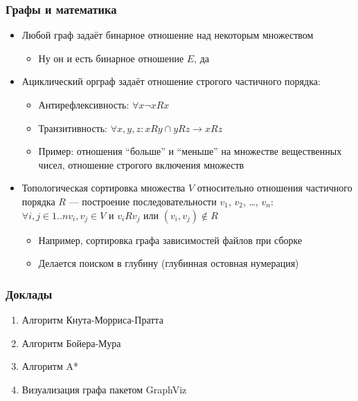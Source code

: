 \documentclass[xetex,mathserif,serif]{beamer}
\begin{document}
    \begin{frame}
        \frametitle{Графы и математика}
        \begin{itemize}
            \item Любой граф задаёт бинарное отношение над некоторым множеством
            \begin{itemize}
                \item Ну он и есть бинарное отношение $E$, да
            \end{itemize}
            \item Ациклический орграф задаёт отношение строгого частичного порядка:
            \begin{itemize}
                \item Антирефлексивность: $\forall x \neg xRx$
                \item Транзитивность: $\forall x,y,z: xRy \cap yRz \rightarrow xRz$
                \item Пример: отношения ``больше'' и ``меньше'' на множестве вещественных чисел, отношение строгого включения множеств
            \end{itemize}
            \item Топологическая сортировка множества $V$ относительно отношения частичного порядка $R$ --- построение последовательности $v_1$, $v_2$, …, $v_n$: 
            $\forall i,j \in 1..n v_i, v_j \in V$ и $v_iRv_j$ или $(v_i, v_j) \not\in R$
            \begin{itemize}
                \item Например, сортировка графа зависимостей файлов при сборке
                \item Делается поиском в глубину (глубинная остовная нумерация)
            \end{itemize}
        \end{itemize}
    \end{frame}

    \begin{frame}
        \frametitle{Доклады}
        \begin{enumerate}
            \item Алгоритм Кнута-Морриса-Пратта
            \item Алгоритм Бойера-Мура
            \item Алгоритм A*
            \item Визуализация графа пакетом GraphViz
        \end{enumerate}
    \end{frame}
\end{document}
